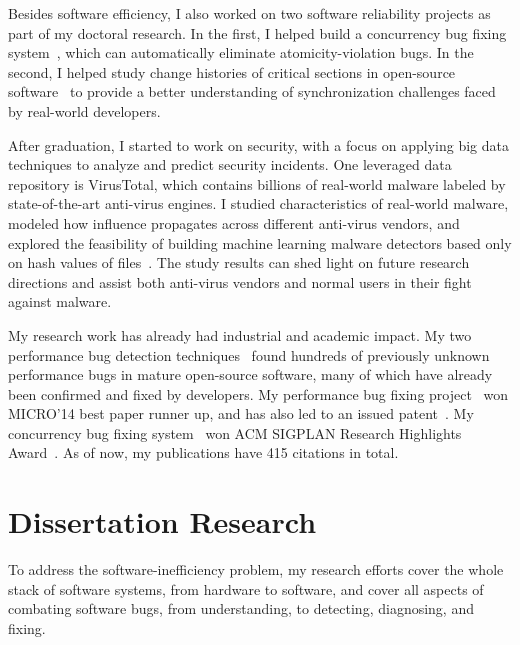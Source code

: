 \documentclass[10pt]{article}
\begin{document}
Besides software efficiency, I also worked on two software reliability projects as part of my doctoral research. In the first, 
I helped build a concurrency bug fixing system~\cite{jin11afix}, 
which can automatically eliminate atomicity-violation bugs.
In the second, I helped study change histories of critical sections in open-source software~\cite{Gu15FSE} 
to provide a better understanding of synchronization challenges faced by real-world developers. 

After graduation, I started to work on security, 
with a focus on applying big data techniques to analyze and predict security incidents. 
One leveraged data repository is VirusTotal, 
which contains billions of real-world malware labeled by state-of-the-art anti-virus engines. 
I studied characteristics of real-world malware, 
modeled how influence propagates across different anti-virus vendors, 
and explored the feasibility of building machine learning malware detectors based only on hash values of files~\cite{Song16ApSys,Song17EuroSys}. 
The study results can shed light on future research directions 
and assist both anti-virus vendors and normal users in their fight against malware.

My research work has already had industrial and academic impact. 
My two performance bug detection techniques~\cite{jin12perfbug, Nistor13ICSE} 
found hundreds of previously unknown performance bugs in mature open-source software, 
many of which have already been confirmed and fixed by developers. 
My performance bug fixing project~\cite{Song14MICRO} won MICRO'14 best paper runner up, 
and has also led to an issued patent~\cite{comppatent}.
My concurrency bug fixing system~\cite{jin11afix} won ACM SIGPLAN Research Highlights Award~\cite{afixnom}. 
As of now, my publications have 415 citations in total. 

\vspace{-.1in}
\section{Dissertation Research}

To address the software-inefficiency problem, my research efforts cover the whole stack of software systems, from hardware to software, 
and cover all aspects of combating software bugs, from understanding, to detecting, diagnosing, and fixing. 

\vspace{-.1in}
\end{document}
